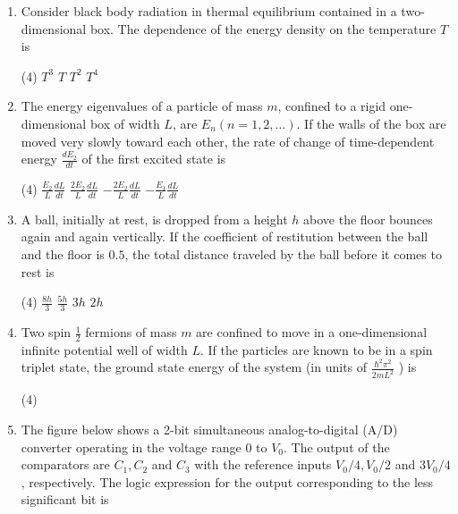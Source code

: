 \begin{enumerate}
\begin{tasks}
	\task[\textbf{a.}]constitutes a vector space of dimension $n$
	\task[\textbf{b.}]constitutes a vector space of dimension $n-1$
	\task[\textbf{c.}]constitutes a vector space of dimension $n-2$
	\task[\textbf{d.}]  does not constitute a vector space	
\end{tasks}
\item Consider black body radiation in thermal equilibrium contained in a two-dimensional box. The dependence of the energy density on the temperature $T$ is
 \begin{tasks}(4)
	\task[\textbf{a.}] $T^{3}$
	\task[\textbf{b.}]$T$
	\task[\textbf{c.}] $T^{2}$
	\task[\textbf{d.}] $T^{4}$
\end{tasks}
\item The energy eigenvalues of a particle of mass $m$, confined to a rigid one-dimensional box of width $L$, are $E_{n}(n=1,2, \ldots)$. If the walls of the box are moved very slowly toward each other, the rate of change of time-dependent energy $\frac{d E_{2}}{d t}$ of the first excited state is
 \begin{tasks}(4)
	\task[\textbf{a.}]$\frac{E_{2}}{L} \frac{d L}{d t}$
	\task[\textbf{b.}]$\frac{2 E_{2}}{L} \frac{d L}{d t}$
	\task[\textbf{c.}]$-\frac{2 E_{2}}{L} \frac{d L}{d t}$
	\task[\textbf{d.}]$-\frac{E_{1}}{L} \frac{d L}{d t}$ 
\end{tasks}
\item A ball, initially at rest, is dropped from a height $h$ above the floor bounces again and again vertically. If the coefficient of restitution between the ball and the floor is $0.5$, the total distance traveled by the ball before it comes to rest is
 \begin{tasks}(4)
	\task[\textbf{a.}]$\frac{8 h}{3}$
	\task[\textbf{b.}]$\frac{5 h}{3}$
	\task[\textbf{c.}] $3 h$
	\task[\textbf{d.}] $2 h$
\end{tasks}
\item Two spin $\frac{1}{2}$ fermions of mass $m$ are confined to move in a one-dimensional infinite potential well of width $L$. If the particles are known to be in a spin triplet state, the ground state energy of the system (in units of $\frac{\hbar^{2} \pi^{2}}{2 m L^{2}}$ ) is
 \begin{tasks}(4)
\end{tasks}
\item  The figure below shows a 2-bit simultaneous analog-to-digital (A/D) converter operating in the voltage range 0 to $V_{0}$. The output of the comparators are $C_{1}, C_{2}$ and $C_{3}$ with the reference inputs $V_{0} / 4, V_{0} / 2$ and $3 V_{0} / 4$, respectively. The logic expression for the output corresponding to the less significant bit is	

\end{enumerate}
